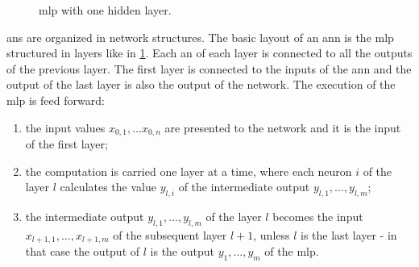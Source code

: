 \begin{figure}
  \centering
  \caption{\acf{mlp} with one hidden layer.}
  \label{fig:ann}
\end{figure}
\acp{an} are organized in network structures. The basic layout of
an  \ac{ann} is the \acf{mlp} structured in layers like in
\cref{fig:ann}. Each \ac{an} of each layer is connected to all the
outputs of the previous layer. The first layer is connected to the
inputs of the \ac{ann} and the output of the last layer is also the
output of the network. The execution of the \ac{mlp} is feed forward:
\begin{enumerate}
\item the input values $x_{0,1},\dots x_{0,n}$ are presented to the
  network and it is the input of the first layer;
\item  the computation is 
  carried one layer at a time, where each neuron $i$ of the layer $l$
  calculates the value $y_{l,i}$ of the intermediate output
  $y_{l,1},\dots,y_{l,m}$;
\item the intermediate output $y_{l,1},\dots,y_{l,m}$ of the layer $l$
  becomes the 
  input $x_{l+1,1},\dots,x_{l+1,m}$ of the subsequent layer $l+1$,
  unless $l$ is the last layer - in that case the output of $l$ is the
  output $y_1,\dots,y_m$ of the \ac{mlp}.
\end{enumerate}


